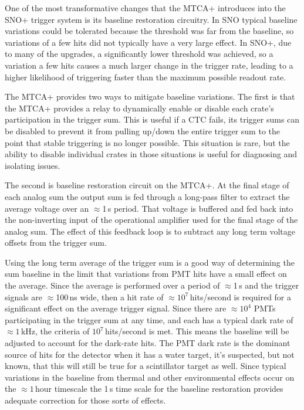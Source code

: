 One of the most transformative changes that the MTCA+ introduces into
the SNO+ trigger system is its baseline restoration circuitry.
In SNO typical baseline variations could be tolerated because
the threshold was far from the baseline, so variations of a few hits
did not typically have a very large effect.
In SNO+, due to many of the upgrades, a significantly lower threshold was achieved,
so a variation a few hits causes a much larger change in the trigger rate,
leading to a higher likelihood of triggering faster than the  maximum possible
readout rate.

The MTCA+ provides two ways to mitigate baseline variations.
The first is that the MTCA+ provides a relay to dynamically enable or disable each
crate's participation in the trigger sum.
This is useful if a CTC fails, its trigger sums can be disabled to prevent it from
pulling up/down the entire trigger sum to the point that stable triggering is no
longer possible.
This situation is rare, but the ability to disable individual
crates in those situations is useful for diagnosing and isolating issues.

The second is baseline restoration circuit on the MTCA+. At the final
stage of each analog sum the output sum is fed through a long-pass
filter to extract the average voltage over an $\approx$1\,s period.
That voltage is buffered and fed back into the non-inverting input
of the operational amplifier used for the final stage of the analog sum.
The effect of this feedback loop is to subtract any long term
voltage offsets from the trigger sum.

Using the long term average of the trigger sum is a good way of
determining the sum baseline in the limit that variations from
PMT hits have a small effect on the average.
Since the average is performed over a period of $\approx$1\,s
and the trigger signals are $\approx$100\,ns wide, then a hit
rate of $\approx 10^7$\,hits/second is required for a significant
effect on the average trigger signal.
Since there are $\approx10^4$ PMTs participating in the trigger sum
at any time, and each has a typical dark rate of $\approx1$\,kHz, the
criteria of $10^7$\,hits/second is met.
This means the baseline will be adjusted to account for the dark-rate hits.
The PMT dark rate is the dominant source of hits for the detector when it has
a water target, it's suspected, but not known, that this will still be true for
a scintillator target as well.
Since typical variations in the baseline from thermal and other environmental
effects occur on the $\approx1$\,hour timescale the 1\,s time scale for the
baseline restoration provides adequate correction for those sorts of effects.

